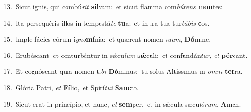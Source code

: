 {\numbfont\textcolor{\numbcolor}{13.}}~Sicut ignis, qui combú\textit{rit} \textbf{sil}\-vam:~\star et sicut flamma com\-\textit{bú}\-\textit{rens} \textbf{mon}\-tes:\par
{\numbfont\textcolor{\numbcolor}{14.}}~Ita persequéris illos in tempestá\textit{te} \textbf{tu}\-a:~\star et in ira tua tur\-\textit{bá}\-\textit{bis} \textbf{e}\-os.\par
{\numbfont\textcolor{\numbcolor}{15.}}~Imple fácies eórum i\-\textit{gno}\-\textbf{mí}nia:~\star et quærent nomen \textit{tu}\-\textit{um}, \textbf{Dó}\-mine.\par
{\numbfont\textcolor{\numbcolor}{16.}}~Erubéscant, et conturbéntur in sǽcu\textit{lum} \textbf{sǽ}\-culi:~\star et confundán\-\textit{tur}\-, \textit{et} \textbf{pér}\-eant.\par
{\numbfont\textcolor{\numbcolor}{17.}}~Et cognóscant quia nomen ti\textit{bi} \textbf{Dó}\-minus:~\star tu solus Altíssimus in \textit{om}\-\textit{ni} \textbf{ter}\-ra.\par
{\numbfont\textcolor{\numbcolor}{18.}}~Glória Patri, \textit{et} \textbf{Fí}\-lio,~\star et Spirí\-\textit{tu}\-\textit{i} \textbf{Sanc}\-to.\par
{\numbfont\textcolor{\numbcolor}{19.}}~Sicut erat in princípio, et nunc, \textit{et} \textbf{sem}\-per,~\star et in sǽcula sæcu\-\textit{ló}\-\textit{rum}. \textbf{A}\-men.\par
